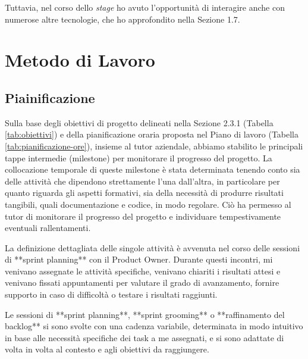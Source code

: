         \noindent Tuttavia, nel corso dello \textit{stage} ho avuto l’opportunità di interagire anche con numerose altre tecnologie, che ho approfondito nella Sezione 1.7.

    \section{Metodo di Lavoro}
        \subsection{Piainificazione}
        
        Sulla base degli obiettivi di progetto delineati nella Sezione 2.3.1 (Tabella \ref{tab:obiettivi}) e della pianificazione oraria proposta nel Piano di lavoro (Tabella \ref{tab:pianificazione-ore}), insieme al tutor aziendale, abbiamo stabilito le principali tappe intermedie (milestone) per monitorare il progresso del progetto. La collocazione temporale di queste milestone è stata determinata tenendo conto sia delle attività che dipendono strettamente l'una dall'altra, in particolare per quanto riguarda gli aspetti formativi, sia della necessità di produrre risultati tangibili, quali documentazione e codice, in modo regolare. Ciò ha permesso al tutor di monitorare il progresso del progetto e individuare tempestivamente eventuali rallentamenti.

        La definizione dettagliata delle singole attività è avvenuta nel corso delle sessioni di **sprint planning** con il Product Owner. Durante questi incontri, mi venivano assegnate le attività specifiche, venivano chiariti i risultati attesi e venivano fissati appuntamenti per valutare il grado di avanzamento, fornire supporto in caso di difficoltà o testare i risultati raggiunti. 

        Le sessioni di **sprint planning**, **sprint grooming** o **raffinamento del backlog** si sono svolte con una cadenza variabile, determinata in modo intuitivo in base alle necessità specifiche dei task a me assegnati, e si sono adattate di volta in volta al contesto e agli obiettivi da raggiungere.

